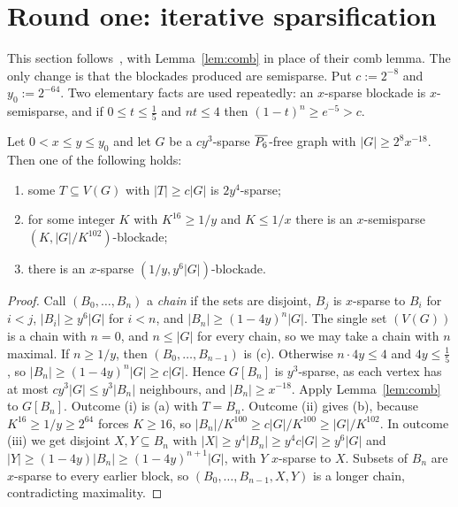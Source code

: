 \section{Round one: iterative sparsification}\label{sec:round1}

This section follows~\cite[Lemmas 5.3--5.5]{NSS7}, with Lemma~\ref{lem:comb} in place of their comb
lemma. The only change is that the blockades produced are semisparse. Put $c:=2^{-8}$ and $y_0:=2^{-64}$.
Two elementary facts are used repeatedly: an $x$-sparse blockade is $x$-semisparse, and if $0\le t\le
\frac15$ and $nt\le4$ then $(1-t)^n\ge e^{-5}>c$.

\begin{lemma}\label{lem:r1step}
Let $0<x\le y\le y_0$ and let $G$ be a $cy^3$-sparse $\overline{P_6}$-free graph with $|G|\ge2^8x^{-18}$. Then
one of the following holds:
\begin{enumerate}[label=(\alph*)]
\item some $T\subseteq V(G)$ with $|T|\ge c|G|$ is $2y^4$-sparse;
\item for some integer $K$ with $K^{16}\ge1/y$ and $K\le1/x$ there is an $x$-semisparse
  $(K,|G|/K^{102})$-blockade;
\item there is an $x$-sparse $(1/y,y^6|G|)$-blockade.
\end{enumerate}
\end{lemma}
\begin{proof}
Call $(B_0,\dots,B_n)$ a \emph{chain} if the sets are disjoint, $B_j$ is $x$-sparse to $B_i$ for $i<j$,
$|B_i|\ge y^6|G|$ for $i<n$, and $|B_n|\ge(1-4y)^n|G|$. The single set $(V(G))$ is a chain with $n=0$, and
$n\le|G|$ for every chain, so we may take a chain with $n$ maximal. If $n\ge1/y$, then $(B_0,\dots,B_{n-1})$ is
(c). Otherwise $n\cdot4y\le4$ and $4y\le\frac15$, so $|B_n|\ge(1-4y)^n|G|\ge c|G|$. Hence $G[B_n]$ is
$y^3$-sparse, as each vertex has at most $cy^3|G|\le y^3|B_n|$ neighbours, and $|B_n|\ge x^{-18}$. Apply
Lemma~\ref{lem:comb} to $G[B_n]$. Outcome (i) is (a) with $T=B_n$. Outcome (ii) gives (b), because
$K^{16}\ge1/y\ge2^{64}$ forces $K\ge16$, so $|B_n|/K^{100}\ge c|G|/K^{100}\ge|G|/K^{102}$. In outcome (iii)
we get disjoint $X,Y\subseteq B_n$ with $|X|\ge y^4|B_n|\ge y^4c|G|\ge y^6|G|$ and $|Y|\ge(1-4y)|B_n|\ge
(1-4y)^{n+1}|G|$, with $Y$ $x$-sparse to $X$. Subsets of $B_n$ are $x$-sparse to every earlier block, so
$(B_0,\dots,B_{n-1},X,Y)$ is a longer chain, contradicting maximality.
\end{proof}

